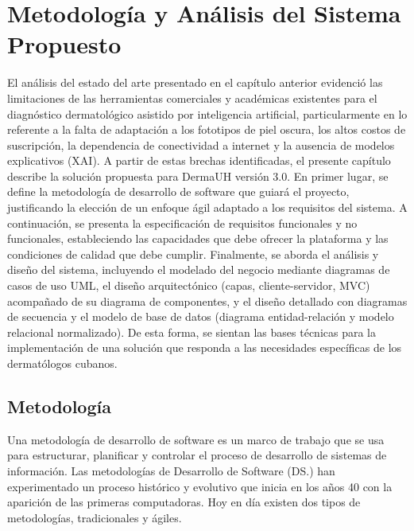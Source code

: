 \chapter{Metodología y Análisis del Sistema Propuesto}

El análisis del estado del arte presentado en el capítulo anterior evidenció las 
limitaciones de las herramientas comerciales y académicas existentes para el diagnóstico 
dermatológico asistido por inteligencia artificial, particularmente en lo referente a la 
falta de adaptación a los fototipos de piel oscura, los altos costos de suscripción, 
la dependencia de conectividad a internet y la ausencia de modelos explicativos (XAI). 
A partir de estas brechas identificadas, el presente capítulo describe la solución 
propuesta para DermaUH versión 3.0. En primer lugar, se define la metodología de desarrollo
de software que guiará el proyecto, justificando la elección de un enfoque ágil adaptado 
a los requisitos del sistema. A continuación, se presenta 
la especificación de requisitos funcionales y no funcionales, estableciendo las 
capacidades que debe ofrecer la plataforma y las condiciones de calidad que debe cumplir. 
Finalmente, se aborda el análisis y diseño del sistema, incluyendo el modelado del negocio 
mediante diagramas de casos de uso UML, el diseño arquitectónico (capas, cliente-servidor, 
MVC) acompañado de su diagrama de componentes, y el diseño detallado con diagramas de 
secuencia y el modelo de base de datos (diagrama entidad-relación 
y modelo relacional normalizado). De esta forma, se sientan las bases técnicas para la 
implementación de una solución que responda a las necesidades específicas de los 
dermatólogos cubanos.

\section{Metodolog\'ia}
Una metodología de desarrollo de software es un marco de trabajo que se
usa para estructurar, planificar y controlar el proceso de desarrollo de
sistemas de información. Las metodologías de Desarrollo de Software (DS.) han experimentado un
proceso histórico y evolutivo que inicia en los años 40 con la aparición de las
primeras computadoras. Hoy en d\'ia existen dos tipos de metodolog\'ias, tradicionales y \'agiles. \cite{metodology}

